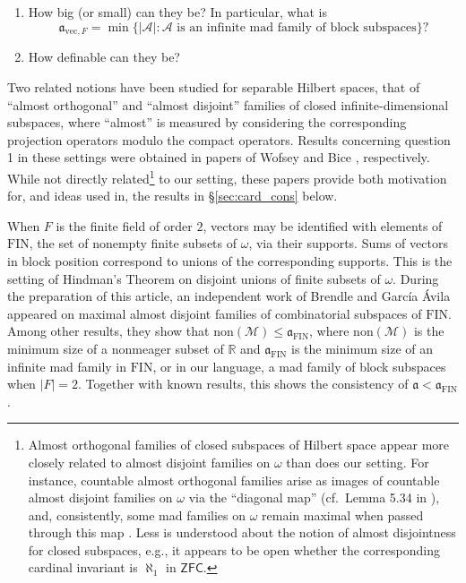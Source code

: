 \documentclass[11pt]{amsart}
\newcommand{\R}{\mathbb{R}}
\newcommand{\LM}{\mathcal{M}}
\newcommand{\LA}{\mathcal{A}}
\renewcommand{\a}{\mathfrak{a}}
\theoremstyle{definition}
\theoremstyle{remark}
\newcommand{\ZFC}{\mathsf{ZFC}}
\renewcommand{\1}{\mathbf{1}}
\newcommand{\FIN}{\mathrm{FIN}}
\begin{document}
\begin{enumerate}[label=\textup{\arabic*.}]
	\item How big (or small) can they be? In particular, what is
	\[
		\a_{\mathrm{vec},F}=\min\{|\LA|:\LA\text{ is an infinite mad family of block subspaces}\}?%
	\]
	\item How definable can they be?	
\end{enumerate}

Two related notions have been studied for separable Hilbert spaces, that of ``almost orthogonal'' and ``almost disjoint'' families of closed infinite-dimensional subspaces, where ``almost'' is measured by considering the corresponding projection operators modulo the compact operators. Results concerning question 1 in these settings were obtained in papers of Wofsey \cite{MR2358514} and Bice \cite{MR2847547}, respectively. While not directly related\footnote{Almost orthogonal families of closed subspaces of Hilbert space appear more closely related to almost disjoint families on $\omega$ than does our setting. For instance, countable almost orthogonal families arise as images of countable almost disjoint families on $\omega$ via the ``diagonal map'' (cf.~Lemma 5.34 in \cite{FarahAST}), and, consistently, some mad families on $\omega$ remain maximal when passed through this map \cite{MR2358514}. Less is understood about the notion of almost disjointness for closed subspaces, e.g., it appears to be open whether the corresponding cardinal invariant is $\aleph_1$ in $\ZFC$.} to our setting, these papers provide both motivation for, and ideas used in, the results in \S\ref{sec:card_cons} below.

When $F$ is the finite field of order $2$, vectors may be identified with elements of $\FIN$, the set of nonempty finite subsets of $\omega$, via their supports. Sums of vectors in block position correspond to unions of the corresponding supports. This is the setting of Hindman's Theorem \cite{MR0349574} on disjoint unions of finite subsets of $\omega$.  During the preparation of this article, an independent work of Brendle and Garc\'{i}a \'{A}vila \cite{MR3685044} appeared on maximal almost disjoint families of combinatorial subspaces of $\FIN$. Among other results, they show that $\mathrm{non}(\LM)\leq\a_{\FIN}$, where $\mathrm{non}(\LM)$ is the minimum size of a nonmeager subset of $\R$ and $\a_{\FIN}$ is the minimum size of an infinite mad family in $\FIN$, or in our language, a mad family of block subspaces when $|F|=2$. Together with known results, this shows the consistency of $\a<\a_{\FIN}$. %
\end{document}
